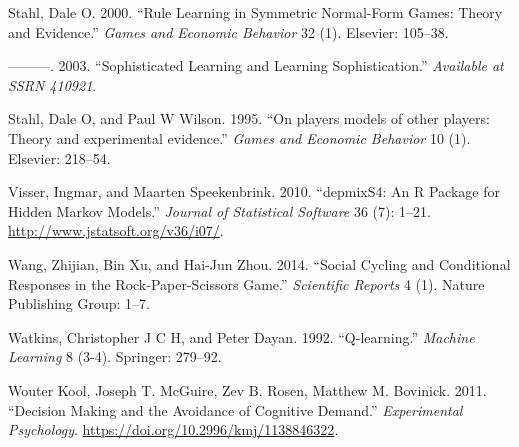 \documentclass[smallextended]{svjour3}       %
\begin{document}
\leavevmode\hypertarget{ref-stahl2000rule}{}%
Stahl, Dale O. 2000. ``Rule Learning in Symmetric Normal-Form Games:
Theory and Evidence.'' \emph{Games and Economic Behavior} 32 (1).
Elsevier: 105--38.

\leavevmode\hypertarget{ref-stahl2003sophisticated}{}%
---------. 2003. ``Sophisticated Learning and Learning Sophistication.''
\emph{Available at SSRN 410921}.

\leavevmode\hypertarget{ref-stahl1995players}{}%
Stahl, Dale O, and Paul W Wilson. 1995. ``On players models of other
players: Theory and experimental evidence.'' \emph{Games and Economic
Behavior} 10 (1). Elsevier: 218--54.

\leavevmode\hypertarget{ref-R-depmixS4}{}%
Visser, Ingmar, and Maarten Speekenbrink. 2010. ``depmixS4: An R Package
for Hidden Markov Models.'' \emph{Journal of Statistical Software} 36
(7): 1--21. \url{http://www.jstatsoft.org/v36/i07/}.

\leavevmode\hypertarget{ref-wang2014social}{}%
Wang, Zhijian, Bin Xu, and Hai-Jun Zhou. 2014. ``Social Cycling and
Conditional Responses in the Rock-Paper-Scissors Game.''
\emph{Scientific Reports} 4 (1). Nature Publishing Group: 1--7.

\leavevmode\hypertarget{ref-watkins1992q}{}%
Watkins, Christopher J C H, and Peter Dayan. 1992. ``Q-learning.''
\emph{Machine Learning} 8 (3-4). Springer: 279--92.

\leavevmode\hypertarget{ref-Kool_2011}{}%
Wouter Kool, Joseph T. McGuire, Zev B. Rosen, Matthew M. Bovinick. 2011.
``Decision Making and the Avoidance of Cognitive Demand.''
\emph{Experimental Psychology}.
\url{https://doi.org/10.2996/kmj/1138846322}.




\end{document}
